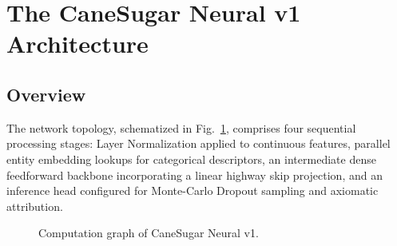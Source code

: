 \documentclass[conference,10pt,letterpaper]{IEEEtran}
\begin{document}
\section{The CaneSugar Neural v1 Architecture}

\subsection{Overview}
The network topology, schematized in Fig.~\ref{fig:architecture}, comprises four sequential processing stages: Layer Normalization applied to continuous features, parallel entity embedding lookups for categorical descriptors, an intermediate dense feedforward backbone incorporating a linear highway skip projection, and an inference head configured for Monte-Carlo Dropout sampling and axiomatic attribution.

\begin{figure}[htbp]
\centering
\footnotesize
\setlength{\fboxsep}{6pt}
\caption{Computation graph of CaneSugar Neural v1.}
\label{fig:architecture}
\end{figure}
\end{document}
